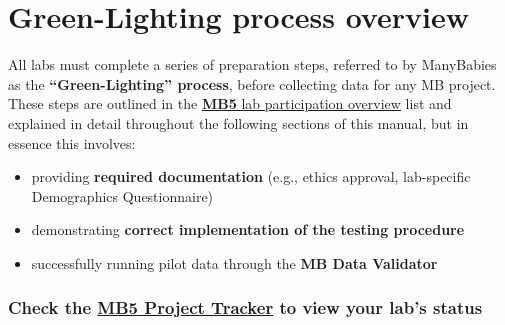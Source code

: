 \documentclass[
  letterpaper,
  DIV=11,
  numbers=noendperiod,
  oneside]{scrreprt}
\providecommand{\tightlist}{%
  \setlength{\itemsep}{0pt}\setlength{\parskip}{0pt}}
\begin{document}
\chapter{Green-Lighting process overview}\label{sec-greenlight}

All labs must complete a series of preparation steps, referred to by
ManyBabies as the \textbf{``Green-Lighting'' process}, before collecting
data for any MB project. These steps are outlined in the
\hyperref[sec-laboverview]{\textbf{MB5} lab participation overview} list
and explained in detail throughout the following sections of this
manual, but in essence this involves:

\begin{itemize}
\tightlist
\item
  providing \textbf{required documentation} (e.g., ethics approval,
  lab-specific Demographics Questionnaire)
\item
  demonstrating \textbf{correct implementation of the testing procedure}
\item
  successfully running pilot data through the \textbf{MB Data Validator}
\end{itemize}

\subsection{\texorpdfstring{Check the
\href{https://manybabies.org/mb5-tracker}{MB5 Project Tracker} to view
your lab's
status}{Check the MB5 Project Tracker to view your lab's status}}\label{check-the-to-view-your-labs-status}
\end{document}
